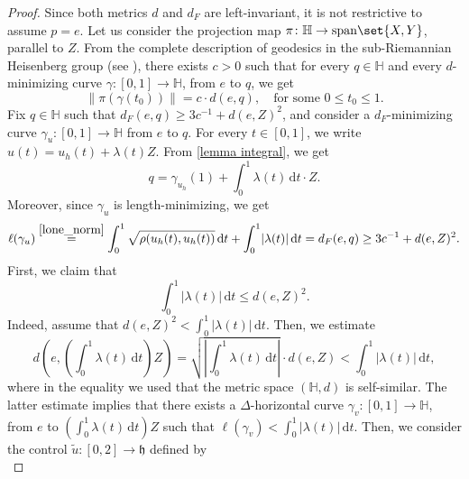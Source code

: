 \documentclass[a4paper,11pt,reqno]{amsart}
\theoremstyle{plain}
\theoremstyle{definition}
\renewcommand{\H}{\mathbb H}
\newcommand{\spn}{\mathrm{span}}
\newcommand{\id}{e}
\newcommand{\de}{\mathrm{d}}
\begin{document}
\begin{proof}
 Since both metrics $d$ and $d_F$ are left-invariant, it is not restrictive to assume $p=\id$.
 Let us consider the projection map $\pi \colon \H \to \spn\set{X,Y}$, parallel to $Z$. From the complete description of geodesics in the sub-Riemannian Heisenberg group (see \cite[Section~2.4.1]{donne2024metricliegroupscarnotcaratheodory}), there exists $c>0$ such that for every $q \in \H$ and every $d$-minimizing curve $\gamma \colon [0,1] \to \H$, from $\id$ to $q$, we get
 \begin{equation} \label{existence_time}
 \lVert \pi(\gamma(t_0)) \rVert = c \cdot d(\id,q), \quad \text{for some $0 \le t_0 \le 1$.}
 \end{equation}
 Fix $q \in \H$ such that $d_F(\id,q) \ge 3c^{-1} + d(\id,Z)^2$, and consider a $d_F$-minimizing curve $\gamma_u \colon [0,1] \to \H$ from $e$ to $q$. For every $t \in [0,1]$, we write $u(t) = u_h(t) + \lambda(t) Z$. From \cref{lemma integral}, we get 
 \begin{equation*}
 q = \gamma_{u_h}(1) + \int^1_0 \lambda(t) \, \de t \cdot Z.
 \end{equation*}
 Moreover, since $\gamma_u$ is length-minimizing, we get
 \begin{equation} \label{lengu}
 \ell(\gamma_u) \stackrel{\eqref{lone_norm}}{=} \int^1_0 \sqrt{\rho(u_h(t),u_h(t))} \, \de t + \int^1_0 \lvert \lambda(t) \rvert \, \de t = d_F(\id,q) \ge 3c^{-1} + d(\id,Z)^2.
 \end{equation}
 First, we claim that \begin{equation} \label{first_claim}
 \int^1_0 \lvert \lambda(t) \rvert \, \de t \le d(\id,Z)^2. 
 \end{equation}
 Indeed, assume that $d(\id,Z)^2 < \int^1_0 \lvert \lambda(t) \rvert \, \de t $. Then, we estimate
 \begin{equation*}
 d\left(\id, \left(\int^1_0 \lambda(t) \, \de t \right) Z\right) = \sqrt{\left\lvert \int^1_0 \lambda(t) \, \de t \right\rvert} \cdot d(\id,Z) < \int^1_0 \lvert \lambda(t) \rvert \, \de t,
 \end{equation*}
 where in the equality we used that the metric space $(\H,d)$ is self-similar. The latter estimate implies that there exists a $\Delta$-horizontal curve $\gamma_{v} \colon [0,1] \to \H$, from $\id$ to $\left(\int^1_0 \lambda(t) \, \de t \right) Z$ such that $\ell(\gamma_{v}) < \int^1_0 \lvert \lambda(t) \rvert \, \de t$. Then, we consider the control $\widetilde{u} \colon [0,2] \to \mathfrak{h}$ defined by 
 \begin{equation*}

\end{equation*}
\end{proof}
\end{document}

